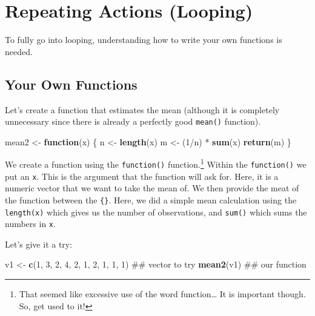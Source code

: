 \documentclass[]{tufte-book}
\newenvironment{Shaded}{}{}
\newcommand{\KeywordTok}[1]{\textcolor[rgb]{0.00,0.44,0.13}{\textbf{#1}}}
\newcommand{\DecValTok}[1]{\textcolor[rgb]{0.25,0.63,0.44}{#1}}
\newcommand{\StringTok}[1]{\textcolor[rgb]{0.25,0.44,0.63}{#1}}
\newcommand{\ControlFlowTok}[1]{\textcolor[rgb]{0.00,0.44,0.13}{\textbf{#1}}}
\newcommand{\OperatorTok}[1]{\textcolor[rgb]{0.40,0.40,0.40}{#1}}
\newcommand{\NormalTok}[1]{#1}
\theoremstyle{definition}
\theoremstyle{definition}
\theoremstyle{remark}
\begin{document}
\section*{Repeating Actions (Looping)}\label{repeating-actions-looping}

To fully go into looping, understanding how to write your own functions
is needed.

\subsection*{Your Own Functions}\label{your-own-functions}

Let's create a function that estimates the mean (although it is
completely unnecessary since there is already a perfectly good
\texttt{mean()} function).

\begin{Shaded}
\begin{Highlighting}[]
\NormalTok{mean2 <-}\StringTok{ }\ControlFlowTok{function}\NormalTok{(x) \{}
\NormalTok{    n <-}\StringTok{ }\KeywordTok{length}\NormalTok{(x)}
\NormalTok{    m <-}\StringTok{ }\NormalTok{(}\DecValTok{1}\OperatorTok{/}\NormalTok{n) }\OperatorTok{*}\StringTok{ }\KeywordTok{sum}\NormalTok{(x)}
    \KeywordTok{return}\NormalTok{(m)}
\NormalTok{\}}
\end{Highlighting}
\end{Shaded}

We create a function using the \texttt{function()} function.\footnote{That
  seemed like excessive use of the word function\ldots{} It is important
  though. So, get used to it!} Within the \texttt{function()} we put an
\texttt{x}. This is the argument that the function will ask for. Here,
it is a numeric vector that we want to take the mean of. We then provide
the meat of the function between the \texttt{\{\}}. Here, we did a
simple mean calculation using the \texttt{length(x)} which gives us the
number of observations, and \texttt{sum()} which sums the numbers in
\texttt{x}.

Let's give it a try:

\begin{Shaded}
\begin{Highlighting}[]
\NormalTok{v1 <-}\StringTok{ }\KeywordTok{c}\NormalTok{(}\DecValTok{1}\NormalTok{, }\DecValTok{3}\NormalTok{, }\DecValTok{2}\NormalTok{, }\DecValTok{4}\NormalTok{, }\DecValTok{2}\NormalTok{, }\DecValTok{1}\NormalTok{, }\DecValTok{2}\NormalTok{, }\DecValTok{1}\NormalTok{, }\DecValTok{1}\NormalTok{, }\DecValTok{1}\NormalTok{)  ## vector to try}
\KeywordTok{mean2}\NormalTok{(v1)  ## our function}
\end{Highlighting}
\end{Shaded}
\end{document}

